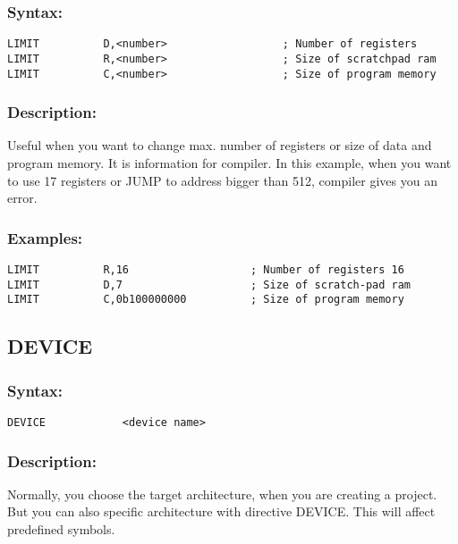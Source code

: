         \subsubsection{Syntax:}
            \verb'LIMIT          D,<number>                  ; Number of registers '\\
            \verb'LIMIT          R,<number>                  ; Size of scratchpad ram '\\
            \verb'LIMIT          C,<number>                  ; Size of program memory '\\

        \subsubsection{Description:}
            Useful when you want to change max. number of registers or size of  data and program memory. It is information for compiler. In this example, when you want to use 17 registers or JUMP to address bigger than 512, compiler gives you an error.

        \subsubsection{Examples:}
            {
                \usecodefont
                \verb'LIMIT          R,16                   ; Number of registers 16'\\
                \verb'LIMIT          D,7                    ; Size of scratch-pad ram   '\\
                \verb'LIMIT          C,0b100000000          ; Size of program memory '\\
            }

    \subsection{DEVICE}
        \subsubsection{Syntax:}
            \verb'DEVICE            <device name>'

        \subsubsection{Description:}
            Normally, you choose the target architecture, when you are creating a project. But you can also specific architecture with directive DEVICE. This will affect predefined symbols.

